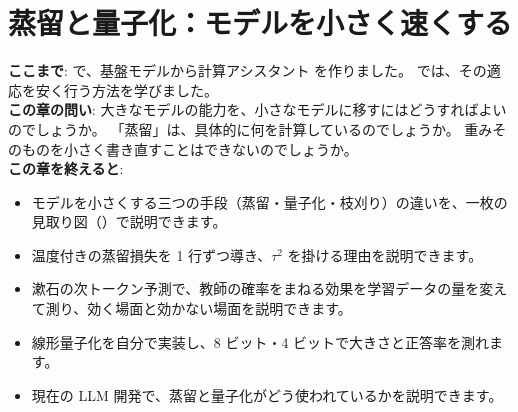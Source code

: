 \chapter{蒸留と量子化：モデルを小さく速くする}\label{ch:distillation}

\begin{chapterlead}
\textbf{ここまで}: で、基盤モデルから計算アシスタント  を作りました。
では、その適応を安く行う方法を学びました。\\
\textbf{この章の問い}: 大きなモデルの能力を、小さなモデルに移すにはどうすればよいのでしょうか。
「蒸留」は、具体的に何を計算しているのでしょうか。
重みそのものを小さく書き直すことはできないのでしょうか。\\[1mm]
\textbf{この章を終えると}:
\begin{itemize}
\item モデルを小さくする三つの手段（蒸留・量子化・枝刈り）の違いを、一枚の見取り図（）で説明できます。
\item 温度付きの蒸留損失を 1 行ずつ導き、$\tau^2$ を掛ける理由を説明できます。
\item 漱石の次トークン予測で、教師の確率をまねる効果を学習データの量を変えて測り、効く場面と効かない場面を説明できます。
\item 線形量子化を自分で実装し、8 ビット・4 ビットで大きさと正答率を測れます。
\item 現在の LLM 開発で、蒸留と量子化がどう使われているかを説明できます。
\end{itemize}
\end{chapterlead}

